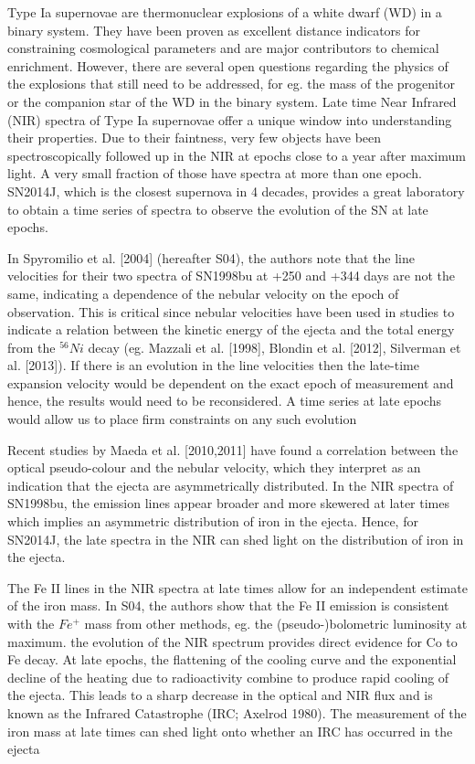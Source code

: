 \documentclass[11pt]{article}
\begin{document}
\sciencejustification    %
Type Ia supernovae are thermonuclear explosions of a white dwarf (WD) in a binary system. They have been proven as excellent distance indicators for constraining cosmological parameters and are major contributors to chemical enrichment. However, there are several open questions regarding the physics of the explosions that still need to be addressed, for eg. the mass of the progenitor or the companion star of the WD in the binary system. 
Late time Near Infrared (NIR) spectra of Type Ia supernovae offer a unique window into understanding their properties. Due to their faintness, very few objects have been spectroscopically followed up in the NIR at epochs close to a year after maximum light. A very small fraction of those have spectra at more than one epoch.
SN2014J, which is the closest supernova in 4 decades, provides a great laboratory to obtain a time series of spectra to observe the evolution of the SN at late epochs.

In Spyromilio et al. [2004] (hereafter S04), the authors note that the line velocities for their two spectra of SN1998bu at +250 and +344 days are not the same, indicating a dependence of the nebular velocity on the epoch of observation. This is critical since nebular velocities have been used in studies to indicate a relation between the kinetic energy of the ejecta and the total energy from the $^{56} Ni$ decay (eg. Mazzali et al. [1998], Blondin et al. [2012], Silverman et al. [2013]). If there is an evolution in the line velocities then the late-time expansion velocity would be dependent on the exact epoch of measurement and hence, the results would need to be reconsidered. A time series at late epochs would allow us to place firm constraints on any such evolution

Recent studies by Maeda et al. [2010,2011] have found a correlation between the optical pseudo-colour and the nebular velocity, which they interpret as an indication that the ejecta are asymmetrically distributed. In the NIR spectra of SN1998bu, the emission lines appear broader and more skewered at later times which implies an asymmetric distribution of iron in the ejecta. Hence, for SN2014J, the late spectra in the NIR can shed light on the distribution of iron in the ejecta. 

The Fe II lines in the NIR spectra at late times allow for an independent estimate of the iron mass. In S04, the authors show that the Fe II emission is consistent with the $Fe^{+}$  mass from other methods, eg. the (pseudo-)bolometric luminosity at maximum.
the evolution of the NIR spectrum provides  direct evidence for Co to Fe decay. 
 At late epochs, the flattening of the cooling curve and the exponential decline of the heating due to radioactivity combine to produce rapid cooling of the ejecta. This leads to a sharp decrease in the optical and NIR flux and is known as the Infrared Catastrophe (IRC; Axelrod 1980). The measurement of the iron mass at late times can shed light onto whether an IRC has occurred in the ejecta 
\end{document}
